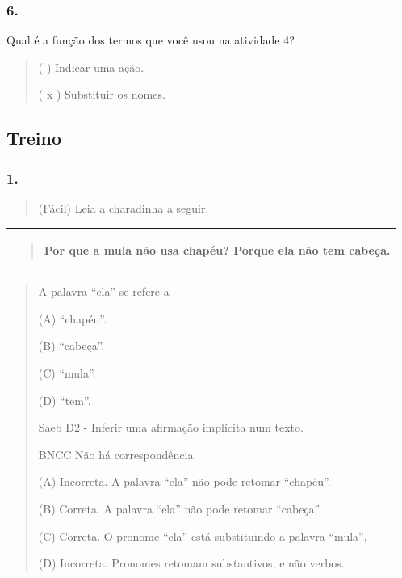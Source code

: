 \subsubsection{6. }\label{section-76}

Qual é a função dos termos que você usou na atividade 4?

\begin{quote}
( ) Indicar uma ação.

( x ) Substituir os nomes.
\end{quote}

\subsection{Treino}\label{treino-9}

\subsubsection{1.}\label{section-77}

\begin{quote}
(Fácil) Leia a charadinha a seguir.
\end{quote}

\begin{longtable}[]{@{}l@{}}
\toprule
\begin{minipage}[t]{0.97\columnwidth}\raggedright\strut
\begin{quote}
Por que a mula não usa chapéu? Porque ela não tem cabeça.
\end{quote}\strut
\end{minipage}\tabularnewline
\bottomrule
\end{longtable}

\begin{quote}
A palavra ``ela'' se refere a

(A) ``chapéu''.

(B) ``cabeça''.

(C) ``mula''.

(D) ``tem''.

Saeb D2 - Inferir uma afirmação implícita num texto.

BNCC Não há correspondência.

(A) Incorreta. A palavra ``ela'' não pode retomar ``chapéu''.

(B) Correta. A palavra ``ela'' não pode retomar ``cabeça''.

(C) Correta. O pronome ``ela'' está substituindo a palavra ``mula'',

(D) Incorreta. Pronomes retomam substantivos, e não verbos.
\end{quote}

